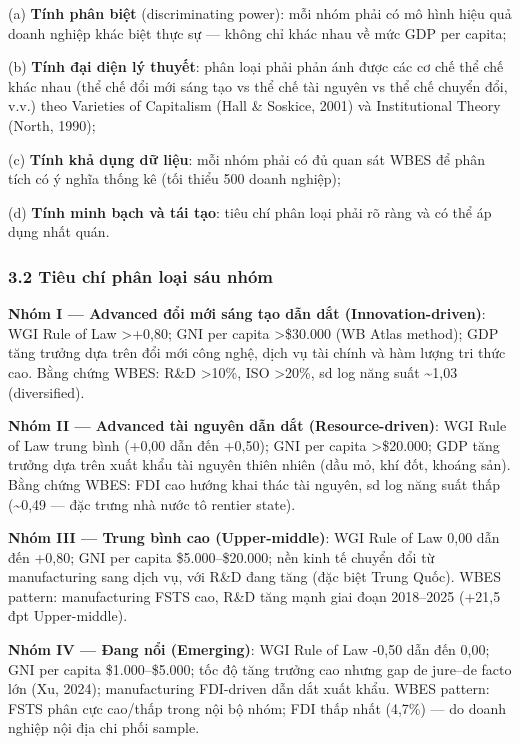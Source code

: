 \documentclass[12pt,a4paper]{article}
\begin{document}
(a) \textbf{Tính phân biệt} (discriminating power): mỗi nhóm phải có mô
hình hiệu quả doanh nghiệp khác biệt thực sự --- không chỉ khác nhau về
mức GDP per capita;

(b) \textbf{Tính đại diện lý thuyết}: phân loại phải phản ánh được các
cơ chế thể chế khác nhau (thể chế đổi mới sáng tạo vs thể chế tài nguyên
vs thể chế chuyển đổi, v.v.) theo Varieties of Capitalism (Hall \&
Soskice, 2001) và Institutional Theory (North, 1990);

(c) \textbf{Tính khả dụng dữ liệu}: mỗi nhóm phải có đủ quan sát WBES để
phân tích có ý nghĩa thống kê (tối thiểu 500 doanh nghiệp);

(d) \textbf{Tính minh bạch và tái tạo}: tiêu chí phân loại phải rõ ràng
và có thể áp dụng nhất quán.

\hypertarget{32-tiuxeau-chuxed-phuxe2n-loux1ea1i-suxe1u-nhuxf3m}{%
\subsubsection{3.2 Tiêu chí phân loại sáu
nhóm}\label{32-tiuxeau-chuxed-phuxe2n-loux1ea1i-suxe1u-nhuxf3m}}

\textbf{Nhóm I --- Advanced đổi mới sáng tạo dẫn dắt
(Innovation-driven)}: WGI Rule of Law \textgreater+0,80; GNI per capita
\textgreater\$30.000 (WB Atlas method); GDP tăng trưởng dựa trên đổi mới
công nghệ, dịch vụ tài chính và hàm lượng tri thức cao. Bằng chứng WBES:
R\&D \textgreater10\%, ISO \textgreater20\%, sd log năng suất
\textasciitilde1,03 (diversified).

\textbf{Nhóm II --- Advanced tài nguyên dẫn dắt (Resource-driven)}: WGI
Rule of Law trung bình (+0,00 dẫn đến +0,50); GNI per capita
\textgreater\$20.000; GDP tăng trưởng dựa trên xuất khẩu tài nguyên
thiên nhiên (dầu mỏ, khí đốt, khoáng sản). Bằng chứng WBES: FDI cao
hướng khai thác tài nguyên, sd log năng suất thấp (\textasciitilde0,49
--- đặc trưng nhà nước tô rentier state).

\textbf{Nhóm III --- Trung bình cao (Upper-middle)}: WGI Rule of Law
0,00 dẫn đến +0,80; GNI per capita \$5.000--\$20.000; nền kinh tế chuyển
đổi từ manufacturing sang dịch vụ, với R\&D đang tăng (đặc biệt Trung
Quốc). WBES pattern: manufacturing FSTS cao, R\&D tăng mạnh giai đoạn
2018--2025 (+21,5 đpt Upper-middle).

\textbf{Nhóm IV --- Đang nổi (Emerging)}: WGI Rule of Law -0,50 dẫn đến
0,00; GNI per capita \$1.000--\$5.000; tốc độ tăng trưởng cao nhưng gap
de jure--de facto lớn (Xu, 2024); manufacturing FDI-driven dẫn dắt xuất
khẩu. WBES pattern: FSTS phân cực cao/thấp trong nội bộ nhóm; FDI thấp
nhất (4,7\%) --- do doanh nghiệp nội địa chi phối sample.
\end{document}
